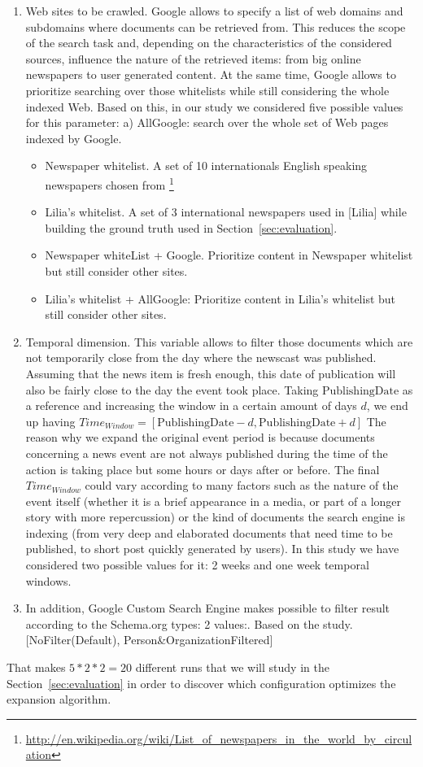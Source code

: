 \documentclass{llncs}
\begin{document}
\begin{enumerate}
 \item Web sites to be crawled. Google allows to specify a list of web domains and subdomains where documents can be retrieved from. This reduces the scope of the search task and, depending on the characteristics of the considered sources, influence the nature of the retrieved items: from big online newspapers to user generated content. At the same time, Google allows to prioritize searching over those whitelists while still considering the  whole indexed Web. Based on this, in our study we considered five possible values for this parameter:
a) AllGoogle: search over the whole set of Web pages indexed by Google.
 \begin{itemize}
  \item Newspaper whitelist. A set of 10 internationals English speaking newspapers chosen from \footnote{\fontsize{8pt}{1em}\selectfont  \url{http://en.wikipedia.org/wiki/List_of_newspapers_in_the_world_by_circulation}}
  \item Lilia's whitelist. A set of 3 international newspapers used in [Lilia] while building the ground truth used in Section~\ref{sec:evaluation}.
  \item Newspaper whiteList + Google. Prioritize content in Newspaper whitelist but still consider other sites.
  \item Lilia's whitelist + AllGoogle: Prioritize content in Lilia's whitelist but still consider other sites.
 \end{itemize}
 \item Temporal dimension. This variable allows to filter those documents which are not temporarily close from the day where the newscast was published. Assuming that the news item is fresh enough, this date of publication will also be fairly close to the day the event  took place. Taking $\text{PublishingDate}$ as a reference and increasing the window in a certain amount of days $d$,  we end up having $Time_{Window}=\left [ \text{PublishingDate}-d, \text{PublishingDate}+d \right ]$ The reason why we expand the original event period is because documents concerning a news event are not always published during the time of the action is taking place but some hours or days after or before. The final $Time_{Window}$ could vary according to many factors such as the nature of the event itself (whether it is a brief appearance in a media, or part of a longer story with more repercussion) or the kind of documents the search engine is indexing (from very deep and elaborated documents that need time to be published, to short post quickly generated by users). In this study we have considered two possible values for it: 2 weeks and one week temporal windows.
 \item In addition, Google Custom Search Engine makes possible to filter result according to the Schema.org types: 2 values:. Based on the study.
[NoFilter(Default), Person\&OrganizationFiltered]
\end{enumerate}
That makes $5 * 2 * 2 = 20$ different runs that we will study in the Section~\ref{sec:evaluation} in order to discover which configuration optimizes the expansion algorithm.
\end{document}
